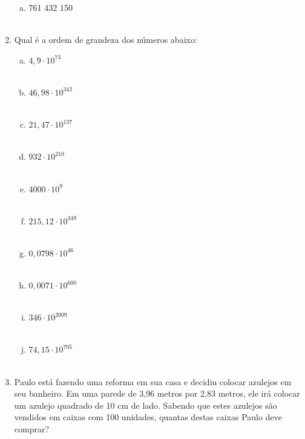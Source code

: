 \documentclass[a4paper,14pt]{article}
\begin{document}
\begin{multicols}{2}
\begin{enumerate}
\begin{enumerate}[a)]
				\item 761 432 150 \\\\
			\end{enumerate}
			\item Qual é a ordem de grandeza dos números abaixo:
			\begin{enumerate}[a)]
				\item $4,9 \cdot 10^{73}$ \\\\
				\item $46,98 \cdot 10^{342}$ \\\\
				\item $21,47 \cdot 10^{137}$ \\\\
				\item $932 \cdot 10^{210}$ \\\\
				\item $4 000 \cdot 10^9$ \\\\
				\item $215,12 \cdot 10^{349}$ \\\\
				\item $0,0798 \cdot 10^{46}$ \\\\
				\item $0,0071 \cdot 10^{600}$ \\\\
				\item $346 \cdot 10^{2009}$ \\\\
				\item $74,15 \cdot 10^{705}$ \\\\
			\end{enumerate}
			\item Paulo está fazendo uma reforma em sua casa e decidiu colocar azulejos em seu banheiro. Em uma parede de 3,96 metros por 2,83 metros, ele irá colocar um azulejo quadrado de 10 cm de lado. Sabendo que estes azulejos são vendidos em caixas com 100 unidades, quantas destas caixas Paulo deve comprar? \\\\\\\\\\\\\\\\\\\\\\\\

\end{enumerate}
\end{multicols}
\end{document}
